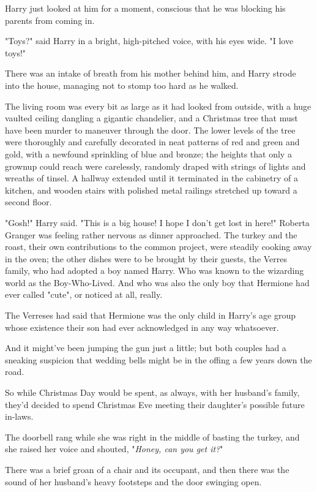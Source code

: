 Harry just looked at him for a moment, conscious that he was blocking his
parents from coming in.

"Toys?" said Harry in a bright, high-pitched voice, with his eyes wide. "I love
toys!"

There was an intake of breath from his mother behind him, and Harry strode into
the house, managing not to stomp too hard as he walked.

The living room was every bit as large as it had looked from outside, with a
huge vaulted ceiling dangling a gigantic chandelier, and a Christmas tree that
must have been murder to maneuver through the door. The lower levels of the
tree were thoroughly and carefully decorated in neat patterns of red and green
and gold, with a newfound sprinkling of blue and bronze; the heights that only
a grownup could reach were carelessly, randomly draped with strings of lights
and wreaths of tinsel. A hallway extended until it terminated in the cabinetry
of a kitchen, and wooden stairs with polished metal railings stretched up
toward a second floor.

"Gosh!" Harry said. "This is a big house! I hope I don't get lost in here!"
\later
Roberta Granger was feeling rather nervous as dinner approached. The turkey
and the roast, their own contributions to the common project, were steadily
cooking away in the oven; the other dishes were to be brought by their guests,
the Verres family, who had adopted a boy named Harry. Who was known to the
wizarding world as the Boy-Who-Lived. And who was also the only boy that
Hermione had ever called "cute", or noticed at all, really.

The Verreses had said that Hermione was the only child in Harry's age group
whose existence their son had ever acknowledged in any way whatsoever.

And it might've been jumping the gun just a little; but both couples had a
sneaking suspicion that wedding bells might be in the offing a few years down
the road.

So while Christmas Day would be spent, as always, with her husband's family,
they'd decided to spend Christmas Eve meeting their daughter's possible future
in-laws.

The doorbell rang while she was right in the middle of basting the turkey, and
she raised her voice and shouted, "\emph{Honey, can you get it?}"

There was a brief groan of a chair and its occupant, and then there was the
sound of her husband's heavy footsteps and the door swinging open.

